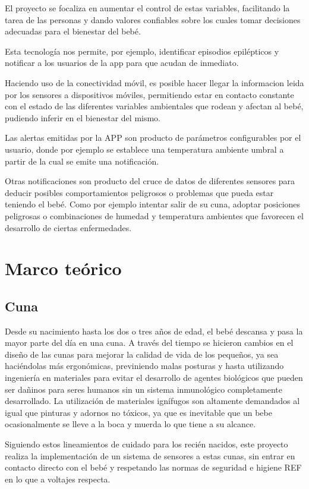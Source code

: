 \documentclass{IEEEtran}
\begin{document}
		El proyecto se focaliza en aumentar el control de estas variables, facilitando la tarea de las personas y dando valores confiables sobre los cuales tomar decisiones adecuadas para el bienestar del bebé.

		Esta tecnología nos permite, por ejemplo, identificar episodios epilépticos y notificar a los usuarios de la app para que acudan de inmediato.

		Haciendo uso de la conectividad móvil, es posible hacer llegar la informacion leida por los sensores a dispositivos móviles, permitiendo estar en contacto constante con el estado de las diferentes variables ambientales que rodean y afectan al bebé, pudiendo inferir en el bienestar del mismo.

		Las alertas emitidas por la APP son producto de parámetros configurables por el usuario, donde por ejemplo se establece una temperatura ambiente umbral a partir de la cual se emite una notificación.

		Otras notificaciones son producto del cruce de datos de diferentes sensores para deducir posibles comportamientos peligrosos o problemas que pueda estar teniendo el bebé. Como por ejemplo intentar salir de su cuna, adoptar posiciones peligrosas o combinaciones de humedad y temperatura ambientes que favorecen el desarrollo de ciertas enfermedades.

	\section{Marco teórico}

		\subsection{Cuna}

			Desde su nacimiento hasta los dos o tres años de edad, el bebé descansa y pasa la mayor parte del día en una cuna. A través del tiempo se hicieron cambios en el diseño de las cunas para mejorar la calidad de vida de los pequeños, ya sea haciéndolas más ergonómicas, previniendo malas posturas y hasta utilizando ingeniería en materiales para evitar el desarrollo de agentes biológicos que pueden ser dañinos para seres humanos sin un sistema inmunológico completamente desarrollado. La utilización de materiales ignífugos son altamente demandados al igual que pinturas y adornos no tóxicos, ya que es inevitable que un bebe ocasionalmente se lleve a la boca y muerda lo que tiene a su alcance.

			Siguiendo estos lineamientos de cuidado para los recién nacidos, este proyecto realiza la implementación de un sistema de sensores a estas cunas, sin entrar en contacto directo con el bebé y respetando las normas de seguridad e higiene REF en lo que a voltajes respecta.
\end{document}

